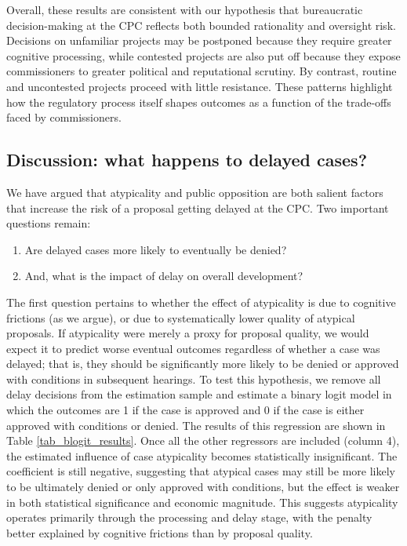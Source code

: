 Overall, these results are consistent with our hypothesis that bureaucratic decision-making at the CPC reflects both bounded rationality and oversight risk. Decisions on unfamiliar projects may be postponed because they require greater cognitive processing, while contested projects are also put off because they expose commissioners to greater political and reputational scrutiny. By contrast, routine and uncontested projects proceed with little resistance. These patterns highlight how the regulatory process itself shapes outcomes as a function of the trade-offs faced by commissioners.

\subsection{Discussion: what happens to delayed cases?}

We have argued that atypicality and public opposition are both salient factors that increase the risk of a proposal getting delayed at the CPC. Two important questions remain: 
\begin{enumerate}
\item Are delayed cases more likely to eventually be denied? 
\item And, what is the impact of delay on overall development?
\end{enumerate}
The first question pertains to whether the effect of atypicality is due to cognitive frictions (as we argue), or due to systematically lower quality of atypical proposals. If atypicality were merely a proxy for proposal quality, we would expect it to predict worse eventual outcomes regardless of whether a case was delayed; that is, they should be significantly more likely to be denied or approved with conditions in subsequent hearings. To test this hypothesis, we remove all delay decisions from the estimation sample and estimate a binary logit model in which the outcomes are 1 if the case is approved and 0 if the case is either approved with conditions or denied. The results of this regression are shown in Table \ref{tab_blogit_results}. Once all the other regressors are included (column 4), the estimated influence of case atypicality becomes statistically insignificant. The coefficient is still negative, suggesting that atypical cases may still be more likely to be ultimately denied or only approved with conditions, but the effect is weaker in both statistical significance and economic magnitude. This suggests atypicality operates primarily through the processing and delay stage, with the penalty better explained by cognitive frictions than by proposal quality.

